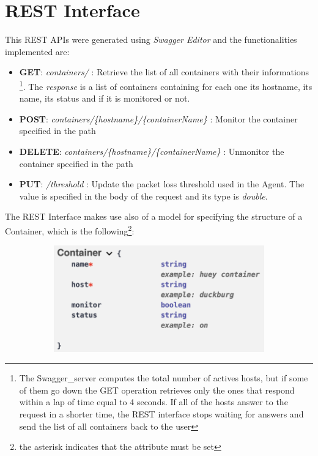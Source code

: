 \section{REST Interface}
This REST APIs were generated using \textit{Swagger Editor} and the functionalities implemented are:

\begin{itemize}
	\item \textbf{GET}:
		\subitem \textit{containers/} : Retrieve the list of all containers with their informations \footnote{The Swagger\_server computes the total number of actives hosts, but if some of them go down the GET operation retrieves only the ones that respond within a lap of time equal to 4 seconds. If all of the hosts answer to the request in a shorter time, the REST interface stops waiting for answers and send the list of all containers back to the user}. The \textit{response} is a list of containers containing for each one its hostname, its name, its status and if it is monitored or not. 
	\item \textbf{POST}:
		\subitem \textit{containers/\{hostname\}/\{containerName\}} : Monitor the container specified in the path
	\item \textbf{DELETE}:
		\subitem \textit{containers/\{hostname\}/\{containerName\}} : Unmonitor the container specified in the path
	\item \textbf{PUT}:
		\subitem \textit{/threshold} : Update the packet loss threshold used in the Agent. The value is specified in the body of the request and its type is \textit{double}.
\end{itemize}

\noindent The REST Interface makes use also of a model for specifying the structure of a Container, which is the following\footnote{the asterisk indicates that the attribute must be set}:

\begin{figure}[H]
	\begin{subfigure}{\textwidth}
	\centering
		\includegraphics[width=0.9\linewidth]{img/container.png} 
	\end{subfigure}
\end{figure}